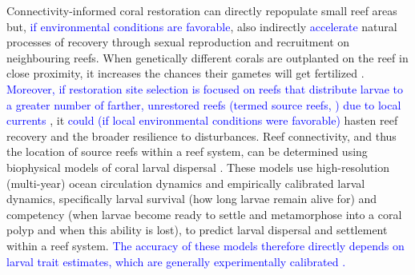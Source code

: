 \documentclass[preprint,12pt,authoryear]{elsarticle}
\newcommand{\modif}[1]{\textcolor{blue}{#1}}
\begin{document}
	Connectivity-informed coral restoration can directly repopulate small reef areas but, \modif{if environmental conditions are favorable}, also indirectly \modif{accelerate} natural processes of recovery through sexual reproduction and recruitment on neighbouring reefs. When genetically different corals are outplanted on the reef in close proximity, it increases the chances their gametes will get fertilized \citep{omori2019coral}. \modif{Moreover, if restoration site selection is focused on reefs that distribute larvae to a greater number of farther, unrestored reefs (termed source reefs, \citealp{bode2018resilient}) due to local currents} \citep{king2023larval}, it \modif{could (if local environmental conditions were favorable)} hasten reef recovery and the broader resilience to disturbances. Reef connectivity, and thus the location of source reefs within a reef system, can be determined using biophysical models of coral larval dispersal \modif{\citep{frys2020fine,figueiredo2022global,holstein2014consistency,holstein2022predicting,king2023larval}}. These models use high-resolution (multi-year) ocean circulation dynamics and empirically calibrated larval dynamics, specifically larval survival (how long larvae remain alive for) and competency (when larvae become ready to settle and metamorphose into a coral polyp and when this ability is lost), to predict larval dispersal and settlement within a reef system. \modif{The accuracy of these models therefore directly depends on larval trait estimates, which are generally experimentally calibrated \citep{limer2024life}.}
	
\end{document}
